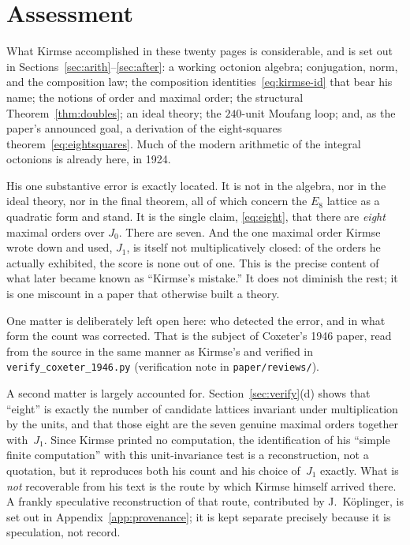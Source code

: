 \documentclass[11pt]{amsart}
\numberwithin{equation}{section}
\theoremstyle{definition}
\theoremstyle{plain}
\theoremstyle{remark}
\begin{document}
\section{Assessment}\label{sec:assess}

What Kirmse accomplished in these twenty pages is considerable, and is set
out in Sections~\ref{sec:arith}--\ref{sec:after}: a working octonion algebra;
conjugation, norm, and the composition law; the composition
identities~\eqref{eq:kirmse-id} that bear his name; the notions of order and
maximal order; the structural Theorem~\ref{thm:doubles}; an ideal theory; the
$240$-unit Moufang loop; and, as the paper's announced goal, a derivation of
the eight-squares theorem~\eqref{eq:eightsquares}.  Much of the modern
arithmetic of the integral octonions is already here, in 1924.

His one substantive error is exactly located.  It is not in the algebra, nor
in the ideal theory, nor in the final theorem, all of which concern the
$E_8$ lattice as a quadratic form and stand.  It is the single claim,
\eqref{eq:eight}, that there are \emph{eight} maximal orders over $J_0$.
There are seven.  And the one maximal order Kirmse wrote down and used,
$J_1$, is itself not multiplicatively closed: of the orders he actually
exhibited, the score is none out of one.  This is the precise content of
what later became known as ``Kirmse's mistake.''  It does not diminish the
rest; it is one miscount in a paper that otherwise built a theory.

One matter is deliberately left open here: who detected the error, and in
what form the count was corrected.  That is the subject of Coxeter's 1946
paper, read from the source in the same manner as Kirmse's and verified in
\texttt{verify\_coxeter\_1946.py} (verification note in \texttt{paper/reviews/}).

A second matter is largely accounted for.  Section~\ref{sec:verify}(d)
shows that ``eight'' is exactly the number of candidate lattices invariant
under multiplication by the units, and that those eight are the seven genuine
maximal orders together with~$J_1$.  Since Kirmse printed no computation, the
identification of his ``simple finite computation'' with this unit-invariance
test is a reconstruction, not a quotation, but it reproduces both his
count and his choice of~$J_1$ exactly.  What is \emph{not} recoverable from
his text is the route by which Kirmse himself arrived there.  A frankly
speculative reconstruction of that route, contributed by J.~K\"oplinger, is
set out in Appendix~\ref{app:provenance}; it is kept separate precisely
because it is speculation, not record.
\end{document}
